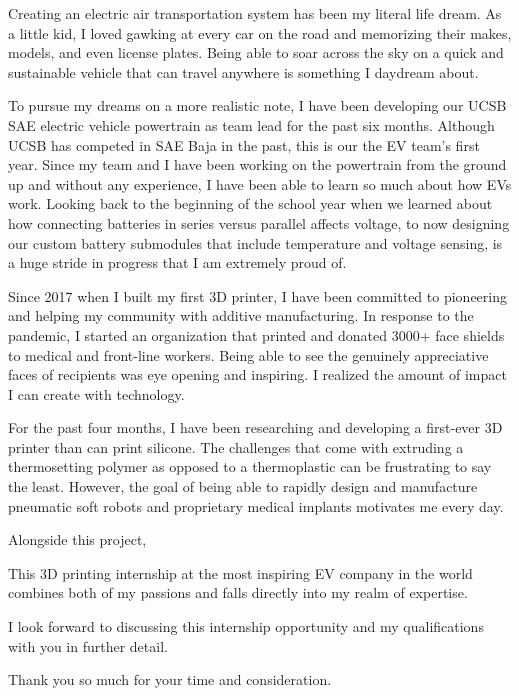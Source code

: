 \documentclass[11pt, letterpaper]{awesome-cv} %
\begin{document}
\makecvheader %

\makelettertitle %


\begin{cvletter}


Creating an electric air transportation system has been my literal life dream. As a little kid, I loved gawking at every car on the road and memorizing their makes, models, and even license plates. Being able to soar across the sky on a quick and sustainable vehicle that can travel anywhere is something I daydream about. 

To pursue my dreams on a more realistic note, I have been developing our UCSB SAE electric vehicle powertrain as team lead for the past six months. Although UCSB has competed in SAE Baja in the past, this is our the EV team's first year. Since my team and I have been working on the powertrain from the ground up and without any experience, I have been able to learn so much about how EVs work. Looking back to the beginning of the school year when we learned about how connecting batteries in series versus parallel affects voltage, to now designing our custom battery submodules that include temperature and voltage sensing, is a huge stride in progress that I am extremely proud of.

Since 2017 when I built my first 3D printer, I have been committed to pioneering and helping my community with additive manufacturing. In response to the pandemic, I started an organization that printed and donated 3000+ face shields to medical and front-line workers. Being able to see the genuinely appreciative faces of recipients was eye opening and inspiring. I realized the amount of impact I can create with technology.

For the past four months, I have been researching and developing a first-ever 3D printer than can print silicone. The challenges that come with extruding a thermosetting polymer as opposed to a thermoplastic can be frustrating to say the least. However, the goal of being able to rapidly design and manufacture pneumatic soft robots and proprietary medical implants motivates me every day.

Alongside this project, 

This 3D printing internship at the most inspiring EV company in the world combines both of my passions and falls directly into my realm of expertise. 

I look forward to discussing this internship opportunity and my qualifications with you in further detail.

Thank you so much for your time and consideration.


\end{cvletter}


\makeletterclosing %
\end{document}
